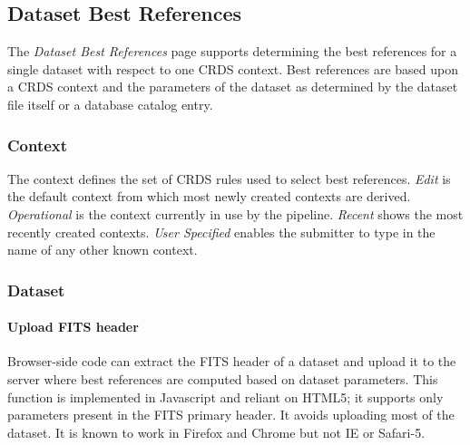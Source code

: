 \documentclass[letterpaper,10pt,english]{sphinxmanual}
\begin{document}
\subsection{Dataset Best References}
\label{web_site_use:dataset-best-references}
The \emph{Dataset Best References} page supports determining the best references for
a single dataset with respect to one CRDS context.   Best references are based
upon a CRDS context and the parameters of the dataset as determined by the
dataset file itself or a database catalog entry.
\begin{figure}[htbp]
\centering

\end{figure}


\subsubsection{Context}
\label{web_site_use:context}
The context defines the set of CRDS rules used to select best references.
\emph{Edit} is the default context from which most newly created contexts are derived.
\emph{Operational} is the context currently in use by the pipeline.   \emph{Recent} shows
the most recently created contexts.   \emph{User Specified} enables the submitter to
type in the name of any other known context.


\subsubsection{Dataset}
\label{web_site_use:dataset}

\paragraph{Upload FITS header}
\label{web_site_use:upload-fits-header}
Browser-side code can extract the FITS header of a dataset and upload it to the
server where best references are computed based on dataset parameters.   This
function is implemented in Javascript and reliant on HTML5;  it supports only
parameters present in the FITS primary header.   It avoids uploading most of the
dataset.   It is known to work in Firefox and Chrome but not IE or Safari-5.
\end{document}
